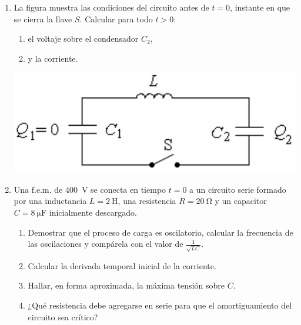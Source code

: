 \documentclass[11pt,spanish,a4paper]{article}
\begin{document}
\begin{enumerate}
	\item \begin{minipage}[t]{0.6\textwidth}
		La figura muestra las condiciones del circuito antes de \(t= 0\), instante en que se cierra la llave \(S\).
		Calcular para todo \(t> 0\):
		\begin{enumerate}
			\item el voltaje sobre el condensador \(C_2\),
			\item y la corriente.
		\end{enumerate}
    \end{minipage}
    \begin{minipage}[c][1em][t]{0.35\textwidth}
		\includegraphics[width=\textwidth]{p5e12}
    \end{minipage}


	\item Una f.e.m. de \SI{400}{\volt} se conecta en tiempo \(t= 0\) a un circuito serie formado por una inductancia \(L= \SI{2}{\henry}\), una resistencia \(R= \SI{20}{\ohm}\) y un capacitor \(C= \SI{8}{\micro\farad}\) inicialmente descargado.
		\begin{enumerate}
			\item Demostrar que el proceso de carga es oscilatorio, calcular la frecuencia de las oscilaciones y compárela con el valor de \(\frac{1}{\sqrt{LC}}\).
			\item Calcular la derivada temporal inicial de la corriente.
			\item Hallar, en forma aproximada, la máxima tensión sobre \(C\).
			\item ¿Qué resistencia debe agregarse en serie para que el amortiguamiento del circuito sea crítico?
		\end{enumerate}



\end{enumerate}
\end{document}
